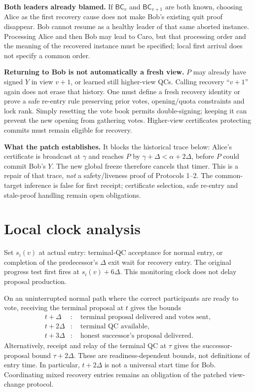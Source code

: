 \documentclass[10pt,a4paper]{article}
\newcommand{\BC}{\mathsf{BC}}
\begin{document}
\textbf{Both leaders already blamed.} If $\BC_v$ and $\BC_{v+1}$ are both
known, choosing Alice as the first recovery cause does not make Bob's
existing quit proof disappear. Bob cannot resume as a healthy leader of
that same aborted instance. Processing Alice and then Bob may lead to Caro,
but that processing order and the meaning of the recovered instance must
be specified; local first arrival does not specify a common order.

\textbf{Returning to Bob is not automatically a fresh view.}
$P$ may already have signed $Y$ in view $v+1$, or learned still higher-view
QCs. Calling recovery ``$v+1$'' again does not erase that history.
One must define a fresh recovery identity or prove a safe re-entry rule
preserving prior votes, opening/quota constraints and lock rank. Simply
resetting the vote book permits double-signing; keeping it can prevent the
new opening from gathering votes. Higher-view certificates protecting
commits must remain eligible for recovery.

\textbf{What the patch establishes.} It blocks the historical trace below:
Alice's certificate is broadcast at $\gamma$ and reaches $P$ by
$\gamma+\Delta<\alpha+2\Delta$, before $P$ could commit Bob's $Y$.
The new global freeze therefore cancels that timer. This is a repair of
that trace, \emph{not} a safety/liveness proof of Protocols 1--2.
The common-target inference is false for first receipt; certificate
selection, safe re-entry and stale-proof handling remain open obligations.
\clearpage
\section*{Local clock analysis}
Set $s_i(v)$ at actual entry: terminal-QC acceptance for normal entry, or
completion of the predecessor's $\Delta$ exit wait for recovery entry.
The original progress test first fires at $s_i(v)+6\Delta$. This monitoring
clock does not delay proposal production.

On an uninterrupted normal path where the correct participants are ready
to vote, receiving the terminal proposal at $t$ gives the bounds
\[
\begin{aligned}
 t+\Delta &: \quad\text{terminal proposal delivered and votes sent},\\
 t+2\Delta &: \quad\text{terminal QC available},\\
 t+3\Delta &: \quad\text{honest successor's proposal delivered}.
\end{aligned}
\]
Alternatively, receipt and relay of the terminal QC at $\tau$ gives the
successor-proposal bound $\tau+2\Delta$. These are readiness-dependent
bounds, not definitions of entry time. In particular, $t+2\Delta$ is not
a universal start time for Bob. Coordinating mixed recovery entries remains
an obligation of the patched view-change protocol.
\end{document}
